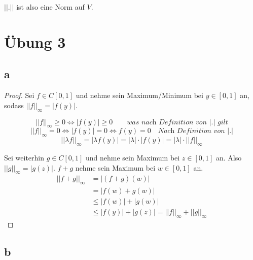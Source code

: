 \documentclass[10pt,a4paper]{article}
\begin{document}
$||.||$ ist also eine Norm auf $V$.

\section*{Übung 3}

\subsection*{a}

\begin{proof}
Sei $f \in C[0,1]$ und nehme sein Maximum/Minimum bei $y \in [0, 1]$ an, sodass $||f||_{\infty} = |f(y)|$.

\begin{equation}
||f||_{\infty} \ge 0 \Leftrightarrow |f(y)| \ge 0 \qquad \textit{was nach Definition von $|.|$ gilt}
\end{equation}
\begin{equation}
||f||_{\infty} = 0 \Leftrightarrow |f(y)| = 0 \Leftrightarrow f(y) = 0 \quad \textit{Nach Definition von $|.|$}
\end{equation}
\begin{equation}
||\lambda f||_{\infty} = |\lambda f(y)| = |\lambda| \cdot |f(y)| = |\lambda| \cdot ||f||_{\infty}
\end{equation}

Sei weiterhin $g \in C[0, 1]$ und nehme sein Maximum bei $z \in [0, 1]$ an.
Also $||g||_{\infty} = |g(z)|$.
$f + g$ nehme sein Maximum bei $w \in [0, 1]$ an.
\begin{align}
||f + g||_{\infty} & = |(f + g)(w)|\\
& = |f(w) + g(w)|\\
& \le |f(w)| + |g(w)|\\
& \le |f(y)| + |g(z)| = ||f||_{\infty} + ||g||_{\infty}
\end{align}
\end{proof}

\subsection*{b}
\end{document}
